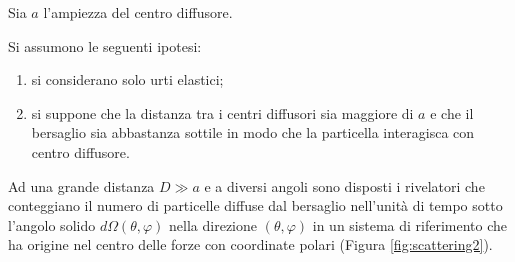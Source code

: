 \documentclass[../../FisicaTeorica.tex]{subfiles}
\begin{document}
Sia $a$ l'ampiezza del centro
diffusore.

Si assumono le seguenti ipotesi:
\begin{enumerate}
  \item si considerano solo urti elastici;
  
  \item si suppone che la distanza tra i centri diffusori sia maggiore di $a$
  e che il bersaglio sia abbastanza sottile in modo che la particella
  interagisca con {} centro diffusore.
\end{enumerate}
Ad una grande distanza $D \gg a$ e a diversi angoli sono disposti i rivelatori
che conteggiano il numero di particelle diffuse dal bersaglio nell'unit{\`a}
di tempo sotto l'angolo solido $d \Omega (\theta, \varphi)$ nella direzione
$(\theta, \varphi)$ in un sistema di riferimento che ha origine nel centro
delle forze con coordinate polari (Figura \ref{fig:scattering2}).
\end{document}
